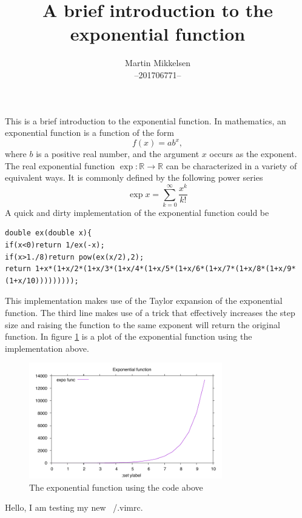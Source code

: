 \documentclass[a4paper,oneside]{memoir}
\newcommand{\R}{\mathbb{R}}
\begin{document}
	\author{Martin Mikkelsen  \\
		--201706771-- \\ }
	\title{A brief introduction to the exponential function}
	\maketitle



	\thispagestyle{firststyle}

This is a brief introduction to the exponential function. In mathematics, an exponential function is a function of the form
\begin{equation} \label{def}
  f(x)=ab^x,
\end{equation}
where $b$ is a positive real number, and the argument $x$  occurs as the exponent. The real exponential function $\exp:\R \rightarrow \R$ can be characterized in a variety of equivalent ways. It is commonly defined by the following power series
\begin{equation}
  \exp{x} = \sum_{k=0}^{\infty} \frac{x^k}{k!}
\end{equation}
A quick and dirty implementation of the exponential function could be
\begin{lstlisting}
double ex(double x){
if(x<0)return 1/ex(-x);
if(x>1./8)return pow(ex(x/2),2);
return 1+x*(1+x/2*(1+x/3*(1+x/4*(1+x/5*(1+x/6*(1+x/7*(1+x/8*(1+x/9*(1+x/10)))))))));
\end{lstlisting}
This implementation makes use of the Taylor expansion of the exponential function. The third line makes use of a trick that effectively increases the step size and raising the function to the same exponent will return the original function.
In figure \ref{Expo} is a plot of the exponential function using the implementation above.
\begin{figure}[H]
  \centering
  \includegraphics[width=0.75\textwidth]{expo}
  \caption{The exponential function using the code above}
  \label{Expo}
\end{figure}
Hello, I am testing my new ~/.vimrc. 
\end{document}
